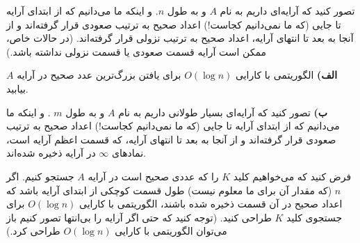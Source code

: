 \documentclass{article}
\begin{document}
تصور کنید که آرایه‌ای داریم به نام 
$A$
 و به طول 
$n$.
و اینکه ما می‌دانیم که از ابتدای آرایه تا جایی
(که
ما نمی‌دانیم کجاست!) اعداد صحیح به ترتیب صعودی قرار گرفته‌اند و از آنجا به بعد تا انتهای آرایه، اعداد
صحیح به ترتیب نزولی قرار گرفته‌اند. (در حالات خاص، ممکن است آرایه قسمت صعودی یا قسمت نزولی 
نداشته باشد.)

\textbf{الف)} 
الگوریتمی با کارایی 
$O(\log n)$
برای یافتن بزرگ‌ترین عدد صحیح در آرایه $A$ بیابید.  


\textbf{ب)} تصور کنید که آرایه‌ای بسیار طولانی داریم به نام 
$A$
 و به طول 
 $m$ 
 . و اینکه ما می‌دانیم که از ابتدای آرایه تا جایی
(که ما نمی‌دانیم کجاست!) اعداد صحیح به ترتیب صعودی قرار گرفته‌اند و 
از آنجا به بعد تا انتهای آرایه، که قسمت اعظم آرایه است، نمادهای 
$\infty$
در آرایه ذخیره شده‌اند. 

فرض کنید که می‌خواهیم کلید 
$K$
 را که عددی صحیح است در آرایه 
 $A$
  جستجو کنیم. اگر 
  $n$
   (که مقدار آن برای
 ما معلوم نیست) طول قسمت کوچکی از ابتدای آرایه باشد که اعداد صحیح در آن قسمت ذخیره شده باشند، 
الگوریتمی با کارایی 
$O(\log n)$
برای جستجوی کلید 
$K$
 طراحی کنید. (توجه کنید که حتی اگر آرایه را بی‌انتها
 تصور کنیم باز می‌توان الگوریتمی با کارایی 
$O(\log n)$
 طراحی کرد.)

 
\end{document}

